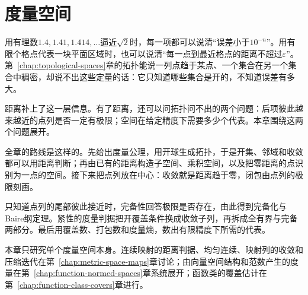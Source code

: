 \chapter{度量空间}
\label{chap:metric-spaces}

用有理数$1.4,1.41,1.414,\ldots$逼近$\sqrt2$时，每一项都可以说清“误差小于$10^{-n}$”。用有限个格点代表一块平面区域时，也可以说清“每一点到最近格点的距离不超过$\varepsilon$”。第~\ref{chap:topological-spaces}章的拓扑能说一列点趋于某点、一个集合在另一个集合中稠密，却说不出这些定量的话：它只知道哪些集合是开的，不知道误差有多大。

距离补上了这一层信息。有了距离，还可以问拓扑问不出的两个问题：后项彼此越来越近的点列是否一定有极限；空间在给定精度下需要多少个代表。本章围绕这两个问题展开。

全章的路线是这样的。先给出度量公理，用开球生成拓扑，于是开集、邻域和收敛都可以用距离判断；再由已有的距离构造子空间、乘积空间，以及把零距离的点识别为一点的空间。接下来把点列放在中心：收敛就是距离趋于零，闭包由点列的极限刻画。

只知道点列的尾部彼此接近时，完备性回答极限是否存在，由此得到完备化与Baire纲定理。紧性的度量判据把开覆盖条件换成收敛子列，再拆成全有界与完备两部分。最后用覆盖数、打包数和度量熵，数出有限精度下所需的代表。

本章只研究单个度量空间本身。连续映射的距离判据、均匀连续、映射列的收敛和压缩迭代在第~\ref{chap:metric-space-maps}章讨论；由向量空间结构和范数产生的度量在第~\ref{chap:function-normed-spaces}章系统展开；函数类的覆盖估计在第~\ref{chap:function-class-covers}章进行。








